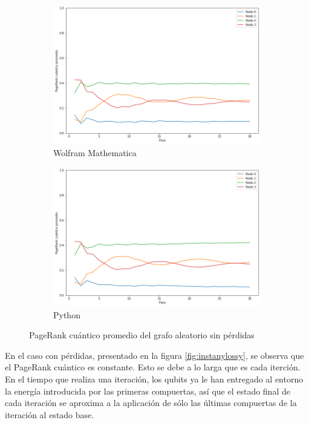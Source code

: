 \begin{figure}[H]
    \centering
    \begin{subfigure}[m]{0.45\textwidth}
        \centering
        \includegraphics[width=0.9\linewidth]{img/any-mean-M.png}
        \caption{Wolfram Mathematica}
    \end{subfigure}
    \begin{subfigure}[m]{0.45\textwidth}
        \centering
        \includegraphics[width=0.9\linewidth]{img/any-mean-lossless.png}
        \caption{Python}
    \end{subfigure}
    \caption[PageRank cuántico promedio del grafo aleatorio sin pérdidas]{PageRank cuántico promedio del grafo aleatorio sin pérdidas}
    \label{fig:meananylossless}
\end{figure}

En el caso con pérdidas, presentado en la figura \ref{fig:instanylossy}, se observa que el PageRank cuántico es constante. Esto se debe a lo larga que es cada iterción. En el tiempo que realiza una iteración, los qubits ya le han entregado al entorno la energía introducida por las primeras compuertas, así que el estado final de cada iteración se aproxima a la aplicación de sólo las últimas compuertas de la iteración al estado base.

